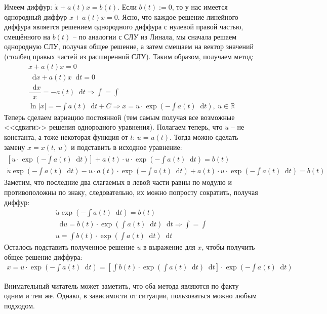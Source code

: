 \documentclass[a4paper,12pt]{article}
\newcommand{\R}{\mathbb{R}}
\renewcommand*\d{\mathop{}\!\mathrm{d}}
\newcommand{\du}{\dot{u}}
\newcommand{\dx}{\dot{x}}
\newcommand{\ds}{\displaystyle}
\begin{document}
Имеем диффур: $\dx + a(t)x = b(t)$. Если $b(t) := 0$, то у нас имеется однородный диффур $\dx + a(t)x = 0$. Ясно, что каждое решение линейного диффура является решением однородного диффура с нулевой правой частью, смещённого на $b(t)$ -- по аналогии с СЛУ из Линала, мы сначала решаем однородную СЛУ, получая общее решение, а затем смещаем на вектор значений (столбец правых частей из расширенной СЛУ). Таким образом, получаем метод:
\begin{gather*}
\dx + a(t)x = 0\\
\d x + a(t)x\d t = 0\\
\dfrac{\d x}{x} = -a(t)\d t \Longrightarrow \ds\int = \int \\
\ln|x| = -\ds\int a(t)\d t + C \Longrightarrow x = u \cdot \exp(-\ds\int a(t) \d t),\ u \in \R
\end{gather*}
Теперь сделаем вариацию постоянной (тем самым получая все возможные <<сдвиги>> решения однородного уравнения). Полагаем теперь, что $u$ -- не константа, а тоже некоторая функция от $t$: $u = u(t)$. 
Тогда можно сделать замену $x = x(t,\ u)$ и подставить в исходное уравнение:
\begin{gather*}
\dot{\left[u \cdot \exp(-\ds\int a(t)\d t)\right]} + a(t) \cdot u \cdot \exp(-\ds\int a(t) \d t) = b(t)\\
\du\exp(-\ds\int a(t) \d t) - u \cdot a(t) \cdot \exp(-\ds\int a(t)\d t) + a(t) \cdot u \cdot \exp(-\ds\int a(t)\d t) = b(t)
\end{gather*}
Заметим, что последние два слагаемых в левой части равны по модулю и противоположны по знаку, следовательно, их можно попросту сократить, получая диффур:
\begin{gather*}
\du\exp(-\ds\int a(t)\d t) = b(t)\\
\d u = b(t) \cdot \exp(\ds\int a(t) \d t) \d t \Longrightarrow \ds\int = \int\\
u = \ds\int b(t) \cdot \exp(\ds\int a(t) \d t) \d t
\end{gather*}
Осталось подставить полученное решение $u$ в выражение для $x$, чтобы получить общее решение диффура:
\begin{gather*}
x = u \cdot \exp(-\ds\int a(t)\d t) = \left[\ds\int b(t) \cdot \exp(\ds\int a(t) \d t)\d t\right] \cdot \exp(-\ds\int a(t) \d t)
\end{gather*}

Внимательный читатель может заметить, что оба метода являются по факту одним и тем же. Однако, в зависимости от ситуации, пользоваться можно любым подходом.
\ \\
\end{document}
